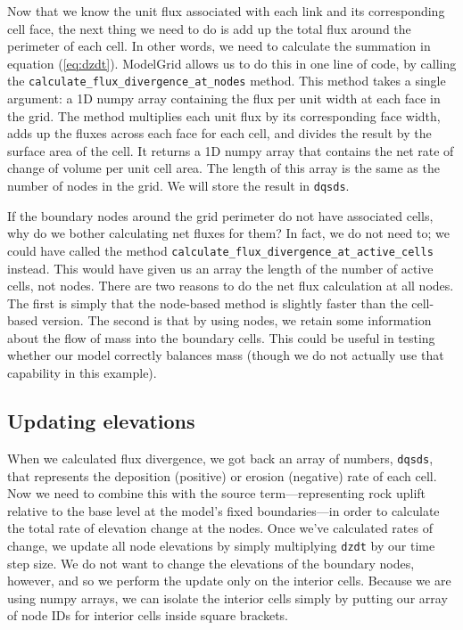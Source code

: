 \documentclass[12pt]{article}
\newcommand{\code}[1]{{\tt #1}}
\begin{document}
Now that we know the unit flux associated with each link and its corresponding cell face, the next thing we need to do is add up the total flux around the perimeter of each cell. In other words, we need to calculate the summation in equation (\ref{eq:dzdt}). ModelGrid allows us to do this in one line of code, by calling the \code{calculate\_flux\_divergence\_at\_nodes} method. This method takes a single argument: a 1D numpy array containing the flux per unit width at each face in the grid. The method multiplies each unit flux by its corresponding face width, adds up the fluxes across each face for each cell, and divides the result by the surface area of the cell. It returns a 1D numpy array that contains the net rate of change of volume per unit cell area. The length of this array is the same as the number of nodes in the grid. We will store the result in \code{dqsds}.

If the boundary nodes around the grid perimeter do not have associated cells, why do we bother calculating net fluxes for them? In fact, we do not need to; we could have called the method \code{calculate\_flux\_divergence\_at\_active\_cells} instead. This would have given us an array the length of the number of active cells, not nodes. There are two reasons to do the net flux calculation at all nodes. The first is simply that the node-based method is slightly faster than the cell-based version. The second is that by using nodes, we retain some information about the flow of mass into the boundary cells. This could be useful in testing whether our model correctly balances mass (though we do not actually use that capability in this example).

\newpage
\subsection{Updating elevations}



When we calculated flux divergence, we got back an array of numbers, \code{dqsds}, that represents the deposition (positive) or erosion (negative) rate of each cell. Now we need to combine this with the source term---representing rock uplift relative to the base level at the model's fixed boundaries---in order to calculate the total rate of elevation change at the nodes. Once we've calculated rates of change, we update all node elevations by simply multiplying \code{dzdt} by our time step size. We do not want to change the elevations of the boundary nodes, however, and so we perform the update only on the interior cells. Because we are using numpy arrays, we can isolate the interior cells simply by putting our array of node IDs for interior cells inside square brackets. 
\end{document}
